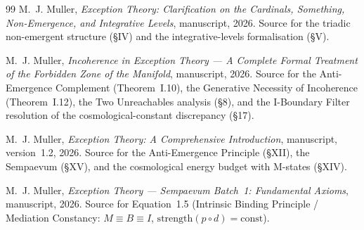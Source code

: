 \documentclass[11pt,a4paper]{article}
\theoremstyle{definition}
\theoremstyle{remark}
\begin{document}
\begin{thebibliography}{99}
M.~J. Muller,
\emph{Exception Theory: Clarification on the Cardinals, Something, Non-Emergence, and Integrative Levels}, manuscript, 2026.
Source for the triadic non-emergent structure (\S IV) and the integrative-levels formalisation (\S V).

M.~J. Muller,
\emph{Incoherence in Exception Theory --- A Complete Formal Treatment of the Forbidden Zone of the Manifold}, manuscript, 2026.
Source for the Anti-Emergence Complement (Theorem~I.10), the Generative Necessity of Incoherence (Theorem~I.12), the Two Unreachables analysis (\S 8), and the I-Boundary Filter resolution of the cosmological-constant discrepancy (\S 17).

M.~J. Muller,
\emph{Exception Theory: A Comprehensive Introduction}, manuscript, version~1.2, 2026.
Source for the Anti-Emergence Principle (\S XII), the Sempaevum (\S XV), and the cosmological energy budget with M-states (\S XIV).

M.~J. Muller,
\emph{Exception Theory --- Sempaevum Batch~1: Fundamental Axioms}, manuscript, 2026.
Source for Equation~1.5 (Intrinsic Binding Principle / Mediation Constancy: $M \equiv B \equiv I$, $\mathrm{strength}(p \circ d) = \mathrm{const}$).

\end{thebibliography}
\end{document}
